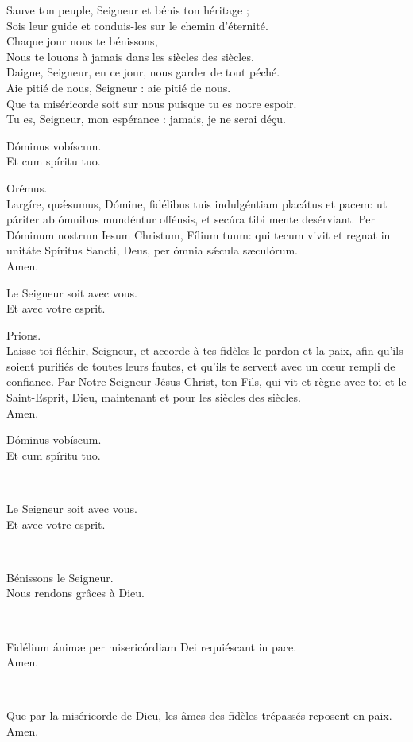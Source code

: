 \documentclass[twoside]{article}
\begin{document}
\begin{paracol}[1]{2}
Sauve ton peuple, Seigneur et bénis ton héritage ;\\
Sois leur guide et conduis-les sur le chemin d’éternité.\\
Chaque jour nous te bénissons,\\
Nous te louons à jamais dans les siècles des siècles.\\
Daigne, Seigneur, en ce jour, nous garder de tout péché.\\
Aie pitié de nous, Seigneur : aie pitié de nous.\\
Que ta miséricorde soit sur nous puisque tu es notre espoir.\\
Tu es, Seigneur, mon espérance : jamais, je ne serai déçu.

\switchcolumn*

\vv Dóminus vobíscum. \\
\rr Et cum spíritu tuo.

Orémus.\\
Largíre, quǽsumus, Dómine, fidélibus tuis indulgéntiam placátus et pacem: ut páriter ab ómnibus mundéntur offénsis, et secúra tibi mente desérviant.
Per Dóminum nostrum Iesum Christum, Fílium tuum: qui tecum vivit et regnat in unitáte Spíritus Sancti, Deus, per ómnia sǽcula sæculórum. \\
\rr Amen.

\switchcolumn

\vv Le Seigneur soit avec vous. \\
\rr Et avec votre esprit.

Prions. \\
Laisse-toi fléchir, Seigneur, et accorde à tes fidèles le pardon et la paix, afin qu’ils soient purifiés de toutes leurs fautes, et qu’ils te servent avec un cœur rempli de confiance.
Par Notre Seigneur Jésus Christ, ton Fils, qui vit et règne avec toi et le Saint-Esprit, Dieu, maintenant et pour les siècles des siècles.\\
\rr Amen.

\switchcolumn*

\vv Dóminus vobíscum. \\
\rr Et cum spíritu tuo.

~~


\switchcolumn

\vv Le Seigneur soit avec vous. \\
\rr Et avec votre esprit.

~~

\vv Bénissons le Seigneur. \\
\rr Nous rendons grâces à Dieu.

\switchcolumn*

~~

\vv Fidélium ánimæ per misericórdiam Dei requiéscant in pace. \\
\rr Amen.

\switchcolumn

~~

\vv Que par la miséricorde de Dieu, les âmes des fidèles trépassés reposent en paix. \\
\rr Amen.

\end{paracol}
\end{document}
